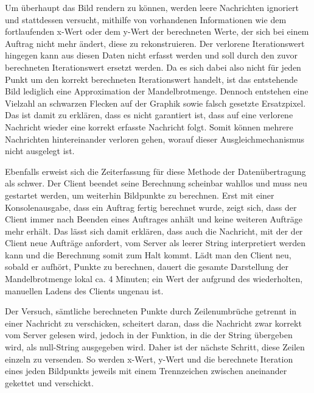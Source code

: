 \documentclass[12pt, onecolumn,notitlepage]{scrartcl}
\begin{document}
Um überhaupt das Bild rendern zu können, werden leere Nachrichten ignoriert und stattdessen versucht, mithilfe von vorhandenen Informationen wie dem fortlaufenden x-Wert oder dem y-Wert der berechneten Werte, der sich bei einem Auftrag nicht mehr ändert, diese zu rekonstruieren. Der verlorene Iterationswert hingegen kann aus diesen Daten nicht erfasst werden und soll durch den zuvor berechneten Iterationswert ersetzt werden. Da es sich dabei also nicht für jeden Punkt um den korrekt berechneten Iterationswert handelt, ist das entstehende Bild lediglich eine Approximation der Mandelbrotmenge. Dennoch entstehen eine Vielzahl an schwarzen Flecken auf der Graphik sowie falsch gesetzte Ersatzpixel. Das ist damit zu erklären, dass es nicht garantiert ist, dass auf eine verlorene Nachricht wieder eine korrekt erfasste Nachricht folgt. Somit können mehrere Nachrichten hintereinander verloren gehen, worauf dieser Ausgleichmechanismus nicht ausgelegt ist. \par

Ebenfalls erweist sich die Zeiterfassung für diese Methode der Datenübertragung als schwer. Der Client beendet seine Berechnung scheinbar wahllos und muss neu gestartet werden, um weiterhin Bildpunkte zu berechnen. Erst mit einer Konsolenausgabe, dass ein Auftrag fertig berechnet wurde, zeigt sich, dass der Client immer nach Beenden eines Auftrages anhält und keine weiteren Aufträge mehr erhält. Das lässt sich damit erklären, dass auch die Nachricht, mit der der Client neue Aufträge anfordert, vom Server als leerer String interpretiert werden kann und die Berechnung somit zum Halt kommt. Lädt man den Client neu, sobald er aufhört, Punkte zu berechnen, dauert die gesamte Darstellung der Mandelbrotmenge lokal ca. 4 Minuten; ein Wert der aufgrund des wiederholten, manuellen Ladens des Clients ungenau ist.\par

Der Versuch, sämtliche berechneten Punkte durch Zeilenumbrüche getrennt in einer Nachricht zu verschicken, scheitert daran, dass die Nachricht zwar korrekt vom Server gelesen wird, jedoch in der Funktion, in die der String übergeben wird, als null-String ausgegeben wird. Daher ist der nächste Schritt, diese Zeilen einzeln zu versenden. So werden x-Wert, y-Wert und die berechnete Iteration eines jeden Bildpunkts jeweils mit einem Trennzeichen zwischen aneinander gekettet und verschickt. 
\end{document}
